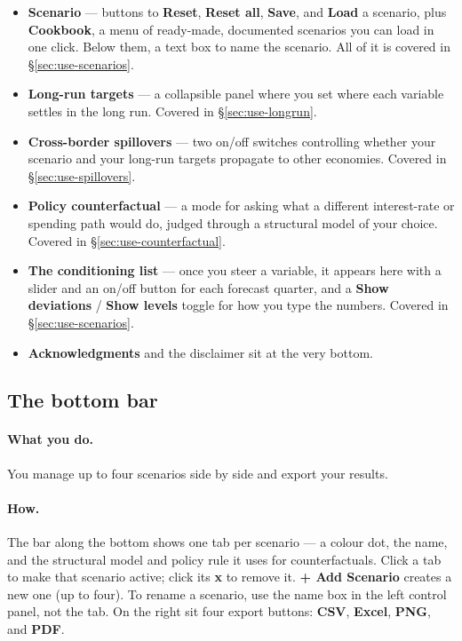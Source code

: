 \documentclass[11pt]{article}
\theoremstyle{definition}
\theoremstyle{remark}
\begin{document}
\begin{itemize}
  \item \textbf{Scenario} --- buttons to \textbf{Reset}, \textbf{Reset all}, \textbf{Save},
    and \textbf{Load} a scenario, plus \textbf{Cookbook}, a menu of ready-made, documented
    scenarios you can load in one click. Below them, a text box to name the scenario. All of
    it is covered in \S\ref{sec:use-scenarios}.
  \item \textbf{Long-run targets} --- a collapsible panel where you set where each variable
    settles in the long run. Covered in \S\ref{sec:use-longrun}.
  \item \textbf{Cross-border spillovers} --- two on/off switches controlling whether your
    scenario and your long-run targets propagate to other economies. Covered in
    \S\ref{sec:use-spillovers}.
  \item \textbf{Policy counterfactual} --- a mode for asking what a different interest-rate or
    spending path would do, judged through a structural model of your choice. Covered in
    \S\ref{sec:use-counterfactual}.
  \item \textbf{The conditioning list} --- once you steer a variable, it appears here with a
    slider and an on/off button for each forecast quarter, and a \textbf{Show deviations} /
    \textbf{Show levels} toggle for how you type the numbers. Covered in
    \S\ref{sec:use-scenarios}.
  \item \textbf{Acknowledgments} and the disclaimer sit at the very bottom.
\end{itemize}

\subsection{The bottom bar}

\paragraph{What you do.} You manage up to four scenarios side by side and export your results.

\paragraph{How.} The bar along the bottom shows one tab per scenario --- a colour dot, the
name, and the structural model and policy rule it uses for counterfactuals. Click a tab to make
that scenario active; click its \textbf{x} to remove it. \textbf{+ Add Scenario} creates a new
one (up to four). To rename a scenario, use the name box in the left control panel, not the
tab. On the right sit four export buttons: \textbf{CSV}, \textbf{Excel}, \textbf{PNG}, and
\textbf{PDF}.
\end{document}
